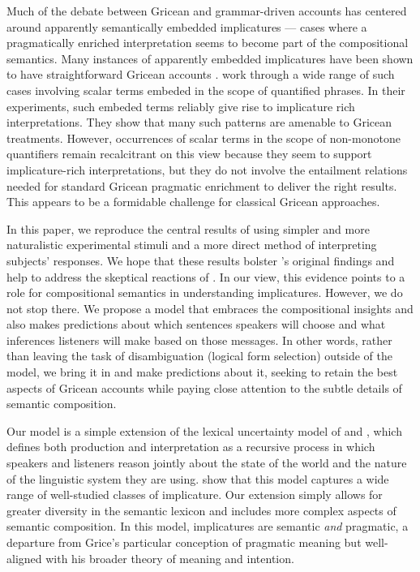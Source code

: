 \documentclass{article}
\begin{document}
Much of the debate between Gricean and grammar-driven accounts has
centered around apparently semantically embedded implicatures ---
cases where a pragmatically enriched interpretation seems to become
part of the compositional semantics. Many instances of apparently
embedded implicatures have been shown to have straightforward Gricean
accounts \citep{Russell06,Geurts09}. \citet{Chemla:Spector:2011} work
through a wide range of such cases involving scalar terms embeded in
the scope of quantified phrases. In their experiments, such embeded
terms reliably give rise to implicature rich interpretations. They
show that many such patterns are amenable to Gricean treatments.
However, occurrences of scalar terms in the scope of non-monotone
quantifiers remain recalcitrant on this view because they seem to
support implicature-rich interpretations, but they do not involve the
entailment relations needed for standard Gricean pragmatic enrichment
to deliver the right results. This appears to be a formidable
challenge for classical Gricean approaches.

In this paper, we reproduce the central results of
\citet{Chemla:Spector:2011} using simpler and more naturalistic
experimental stimuli and a more direct method of interpreting
subjects' responses. We hope that these results bolster
\citeauthor{Chemla:Spector:2011}'s original findings and help to
address the skeptical reactions of \citet{geurts-vantiel:2013:scalar}.
In our view, this evidence points to a role for compositional
semantics in understanding implicatures. However, we do not stop
there.  We propose a model that embraces the compositional insights
\citeauthor{ChierchiaFoxSpector08} and also makes predictions about
which sentences speakers will choose and what inferences listeners
will make based on those messages. In other words, rather than leaving
the task of disambiguation (logical form selection) outside of the
model, we bring it in and make predictions about it, seeking to retain
the best aspects of Gricean accounts while paying close attention to
the subtle details of semantic composition.  

Our model is a simple extension of the lexical uncertainty model of
\citet{Bergen:Goodman:Levy:2012} and \citet{Bergen:Levy:Goodman:2014},
which defines both production and interpretation as a recursive
process in which speakers and listeners reason jointly about the state
of the world and the nature of the linguistic system they are
using. \citeauthor{Bergen:Levy:Goodman:2014} show that this model
captures a wide range of well-studied classes of implicature.  Our
extension simply allows for greater diversity in the semantic lexicon
and includes more complex aspects of semantic composition.  In this
model, implicatures are semantic \emph{and} pragmatic, a departure
from Grice's particular conception of pragmatic meaning but
well-aligned with his broader theory of meaning and intention.
\end{document}
